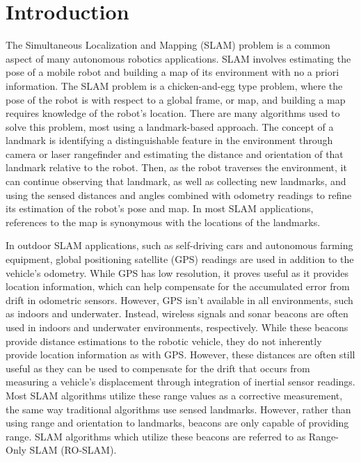 \documentclass[conference]{IEEEtran}
\begin{document}
	\section{Introduction} 
		The Simultaneous Localization and Mapping (SLAM) problem is a common aspect of many autonomous robotics applications. SLAM involves estimating the pose of a mobile robot and building a map of its environment with no a priori information. The SLAM problem is a chicken-and-egg type problem, where the pose of the robot is with respect to a global frame, or map, and building a map requires knowledge of the robot's location. There are many algorithms used to solve this problem, most using a landmark-based approach. The concept of a landmark is identifying a distinguishable feature in the environment through camera or laser rangefinder and estimating the distance and orientation of that landmark relative to the robot. Then, as the robot traverses the environment, it can continue observing that landmark, as well as collecting new landmarks, and using the sensed distances and angles combined with odometry readings to refine its estimation of the robot's pose and map. In most SLAM applications, references to the map is synonymous with the locations of the landmarks.
	
		In outdoor SLAM applications, such as self-driving cars and autonomous farming equipment, global positioning satellite (GPS) readings are used in addition to the vehicle's odometry. While GPS has low resolution, it proves useful as it provides location information, which can help compensate for the accumulated error from drift in odometric sensors. However, GPS isn't available in all environments, such as indoors and underwater. Instead, wireless signals and sonar beacons are often used in indoors and underwater environments, respectively. While these beacons provide distance estimations to the robotic vehicle, they do not inherently provide location information as with GPS. However, these distances are often still useful as they can be used to compensate for the drift that occurs from measuring a vehicle's displacement through integration of inertial sensor readings. Most SLAM algorithms utilize these range values as a corrective measurement, the same way traditional algorithms use sensed landmarks. However, rather than using range and orientation to landmarks, beacons are only capable of providing range. SLAM algorithms which utilize these beacons are referred to as Range-Only SLAM (RO-SLAM). 
		
\end{document}
